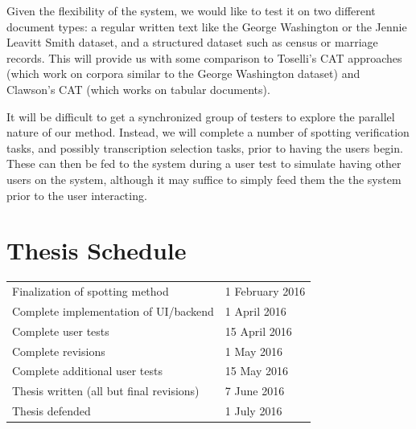 \documentclass[ms]{byuprop}
\begin{document}
Given the flexibility of the system, we would like to test it on two different document types: a regular written text like the George Washington\cite{GW} or the Jennie Leavitt Smith\cite{Smith} dataset, and a structured dataset such as census or marriage records. This will provide us with some comparison to Toselli's CAT approaches (which work on corpora similar to the George Washington dataset) and Clawson's CAT (which works on tabular documents).

It will be difficult to get a synchronized group of testers to explore the parallel nature of our method. Instead, we will complete a number of spotting verification tasks, and possibly transcription selection tasks, prior to having the users begin. These can then be fed to the system during a user test to simulate having other users on the system, although it may suffice to simply feed them the the system prior to the user interacting.



\section{Thesis Schedule}
\begin{table}[H]
\centering
\begin{tabular}{ll}
Finalization of spotting method          & 1 February 2016 \\
Complete implementation of UI/backend    & 1 April 2016    \\
Complete user tests                      & 15 April 2016   \\
Complete revisions                       & 1 May 2016      \\
Complete additional user tests           & 15 May 2016     \\
Thesis written (all but final revisions) & 7 June 2016     \\
Thesis defended                          & 1 July 2016    
\end{tabular}
\end{table}




\end{document}
